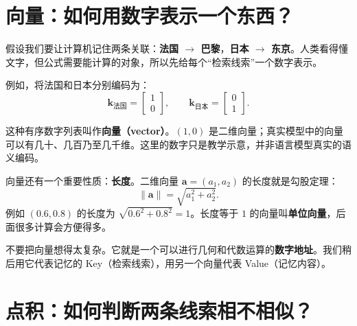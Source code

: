 \documentclass[11pt,a4paper,UTF8]{ctexart}
\numberwithin{equation}{section}
\newcommand{\vect}[1]{\boldsymbol{#1}}
\begin{document}
\section{向量：如何用数字表示一个东西？}

假设我们要让计算机记住两条关联：\textbf{法国 $\rightarrow$ 巴黎}，\textbf{日本 $\rightarrow$ 东京}。人类看得懂文字，但公式需要能计算的对象，所以先给每个“检索线索”一个数字表示。

例如，将法国和日本分别编码为：
\begin{equation}
\vect{k}_{\text{法国}}=\begin{bmatrix}1\\0\end{bmatrix},\qquad
\vect{k}_{\text{日本}}=\begin{bmatrix}0\\1\end{bmatrix}.
\end{equation}

这种有序数字列表叫作\textbf{向量（vector）}。$(1,0)$ 是二维向量；真实模型中的向量可以有几十、几百乃至几千维。这里的数字只是教学示意，并非语言模型真实的语义编码。

\begin{center}
\end{center}

向量还有一个重要性质：\textbf{长度}。二维向量 $\vect{a}=(a_1,a_2)$ 的长度就是勾股定理：
\begin{equation}
\|\vect{a}\|=\sqrt{a_1^2+a_2^2}.
\end{equation}
例如 $(0.6,0.8)$ 的长度为 $\sqrt{0.6^2+0.8^2}=1$。长度等于 $1$ 的向量叫\textbf{单位向量}，后面很多计算会方便得多。

\begin{idea}
不要把向量想得太复杂。它就是一个可以进行几何和代数运算的\textbf{数字地址}。我们稍后用它代表记忆的 Key（检索线索），用另一个向量代表 Value（记忆内容）。
\end{idea}

\section{点积：如何判断两条线索相不相似？}
\end{document}
